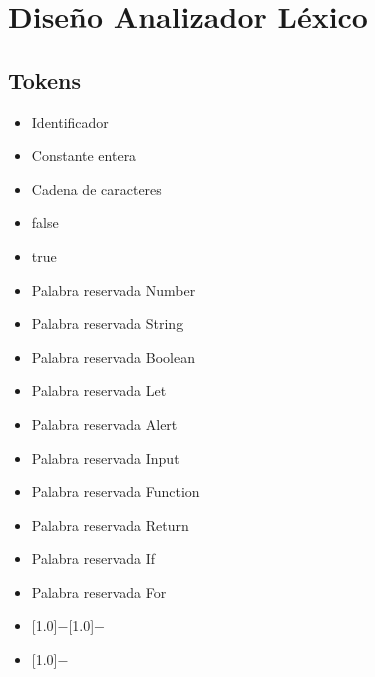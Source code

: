 \documentclass[11pt, , a4paper, titlepage]{article}
\newenvironment{myitemize}
{ \begin{itemize}
    \setlength{\itemsep}{0pt}
    \setlength{\parskip}{2pt}    }
{ \end{itemize}                  }
\newcommand{\minus}{\scalebox{0.75}[1.0]{$-$}}
\newenvironment{changemargin}[2]{%
\begin{list}{}{%
\setlength{\topsep}{0pt}%
\setlength{\leftmargin}{#1}%
\setlength{\rightmargin}{#2}%
\setlength{\listparindent}{\parindent}%
\setlength{\itemindent}{\parindent}%
\setlength{\parsep}{\parskip}%
}%
\item[]}{\end{list}}
\begin{document}
\section{Diseño Analizador Léxico}


\begin{changemargin}{0cm}{+4cm}
    \subsection{Tokens}
    \begin{flushleft}
        \begin{myitemize}
            \item Identificador 
            \item Constante entera 
            \item Cadena de caracteres 
            \item false 
            \item true 
            \item Palabra reservada Number
            \item Palabra reservada String
            \item Palabra reservada Boolean
            \item Palabra reservada Let
            \item Palabra reservada Alert
            \item Palabra reservada Input
            \item Palabra reservada Function
            \item Palabra reservada Return 
            \item Palabra reservada If 
            \item Palabra reservada For
            \item \minus \minus {}
            \item \minus  {}

\end{myitemize}
\end{flushleft}
\end{changemargin}
\end{document}
